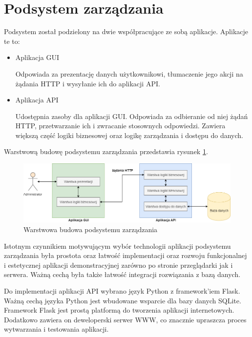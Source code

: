     \section{Podsystem zarządzania}

    	Podsystem został podzielony na dwie współpracujące ze sobą aplikacje. Aplikacje te to:

    	\begin{itemize}
    		\item Aplikacja GUI

    			Odpowiada za prezentację danych użytkownikowi, tłumaczenie jego akcji na żądania HTTP i wysyłanie ich do aplikacji API.

    		\item Aplikacja API

    			Udostępnia zasoby dla aplikacji GUI. Odpowiada za odbieranie od niej żądań HTTP, przetwarzanie ich i zwracanie stosownych odpowiedzi. Zawiera większą część logiki biznesowej oraz logikę zarządzania i dostępu do danych.
    	\end{itemize}

    	Warstwową budowę podsystemu zarządzania przedstawia rysunek \ref{fig:mngmt_subs_layers}.

        \begin{figure}[]
            \centering
            \includegraphics[width=\textwidth]{chapters/images/mngmt_subsystem_layers.png}
            \caption{Warstwowa budowa podsystemu zarządzania}
            \label{fig:mngmt_subs_layers}
        \end{figure}

       	Istotnym czynnikiem motywującym wybór technologii aplikacji podsystemu zarządzania była prostota oraz łatwość implementacji oraz rozwoju funkcjonalnej i estetycznej aplikacji demonstracyjnej zarówno po stronie przeglądarki jak i serwera. Ważną cechą była także łatwość integracji rozwiązania z bazą danych. 

		Do implementacji aplikacji API wybrano język Python z framework'iem Flask. Ważną cechą języka Python jest wbudowane wsparcie dla bazy danych SQLite. Framework Flask jest prostą platformą do tworzenia aplikacji internetowych. Dodatkowo zawiera on deweloperski serwer WWW, co znacznie upraszcza proces wytwarzania i testowania aplikacji.

